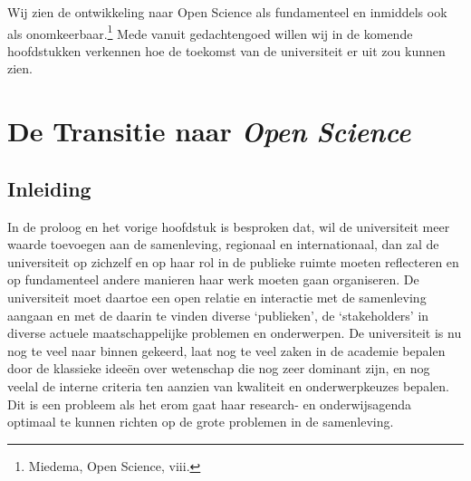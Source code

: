 \documentclass[empirical, authordate, ]{new-jote-article}
\begin{document}
	Wij zien de ontwikkeling naar Open Science als fundamenteel en inmiddels ook als onomkeerbaar.\footnote{Miedema, Open Science, viii.} Mede vanuit gedachtengoed willen wij in de komende hoofdstukken verkennen hoe de toekomst van de universiteit er uit zou kunnen zien.







	\chapter{De Transitie naar \emph{Open }\emph{Science} }



















	\section{Inleiding }



	In de proloog en het vorige hoofdstuk is besproken dat, wil de universiteit meer waarde toevoegen aan de samenleving, regionaal en internationaal, dan zal de universiteit op zichzelf en op haar rol in de publieke ruimte moeten reflecteren en op fundamenteel andere manieren haar werk moeten gaan organiseren. De universiteit moet daartoe een open relatie en interactie met de samenleving aangaan en met de daarin te vinden diverse ‘publieken', de ‘stakeholders' in diverse actuele maatschappelijke problemen en onderwerpen. De universiteit is nu nog te veel naar binnen gekeerd, laat nog te veel zaken in de academie bepalen door de klassieke ideeën over wetenschap die nog zeer dominant zijn, en nog veelal de interne criteria ten aanzien van kwaliteit en onderwerpkeuzes bepalen. Dit is een probleem als het erom gaat haar research- en onderwijsagenda optimaal te kunnen richten op de grote problemen in de samenleving.
\end{document}
